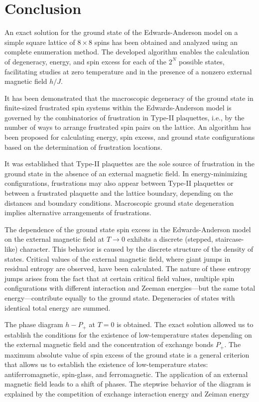 \documentclass[preprint,12pt]{elsarticle}
\begin{document}
	\section{Conclusion}
	
	An exact solution for the ground state of the Edwards-Anderson model on a simple square lattice of $8 \times 8$ spins has been obtained and analyzed using an complete enumeration method. The developed algorithm enables the calculation of degeneracy, energy, and spin excess for each of the $2^N$ possible states, facilitating studies at zero temperature and in the presence of a nonzero external magnetic field $h/J$.
	
	It has been demonstrated that the macroscopic degeneracy of the ground state in finite-sized frustrated spin systems within the Edwards-Anderson model is governed by the combinatorics of frustration in  Type-II plaquettes, i.e., by the number of ways to arrange frustrated spin pairs on the lattice. An algorithm has been proposed for calculating energy, spin excess, and ground state configurations based on the determination of frustration locations.
	
	It was established that Type-II plaquettes are the sole source of frustration in the ground state in the absence of an external magnetic field. In energy-minimizing configurations, frustrations may also appear between Type-II plaquettes or between a frustrated plaquette and the lattice boundary, depending on the distances and boundary conditions. Macroscopic ground state degeneration implies alternative arrangements of frustrations.
	
	The dependence of the ground state spin excess in the Edwards-Anderson model on the external magnetic field at $T \to 0$ exhibits a discrete (stepped, staircase-like) character. This behavior is caused by the discrete structure of the density of states. Critical values of the external magnetic field, where giant jumps in residual entropy are observed, have been calculated. The nature of these entropy jumps arises from the fact that at certain critical field values, multiple spin configurations with different interaction and Zeeman energies—but the same total energy—contribute equally to the ground state. Degeneracies of states with identical total energy are summed.
	
	The phase diagram $h - P_+$ at $T = 0$ is obtained. The exact solution allowed us to establish the conditions for the existence of low-temperature states depending on the external magnetic field and the concentration of exchange bonds $P_+$. The maximum absolute value of spin excess of the ground state is a general criterion that allows us to establish the existence of low-temperature states: antiferromagnetic, spin-glass, and ferromagnetic. The application of an external magnetic field leads to a shift of phases. The stepwise behavior of the diagram is explained by the competition of exchange interaction energy and Zeiman energy
	
\end{document}

